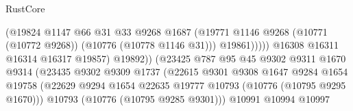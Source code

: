 \begin{lexlean}{RustCore}
\begin{coremodule}
                                                  (@19824
                                                    @1147
                                                    @66
                                                    @31
                                                    @33
                                                    @9268
                                                    @1687
                                                    (@19771
                                                      @1146
                                                      @9268
                                                      (@10771 (@10772 @9268))
                                                      (@10776 (@10778 @1146 @31)))
                                                    @19861)))))
                                          @16308
                                          @16311
                                          @16314
                                          @16317
                                          @19857)
                                        @19892))
                                    (@23425
                                      @787
                                      @95
                                      @45
                                      @9302
                                      @9311
                                      @1670
                                      @9314
                                      (@23435
                                        @9302
                                        @9309
                                        @1737
                                        (@22615
                                          @9301
                                          @9308
                                          @1647
                                          @9284
                                          @1654
                                          @19758
                                          (@22629
                                            @9294
                                            @1654
                                            @22635
                                            @19777
                                            @10793
                                            (@10776 (@10795 @9295 @1670)))
                                          @10793
                                          (@10776 (@10795 @9285 @9301)))
                                        @10991
                                        @10994
                                        @10997

\end{coremodule}
\end{lexlean}
